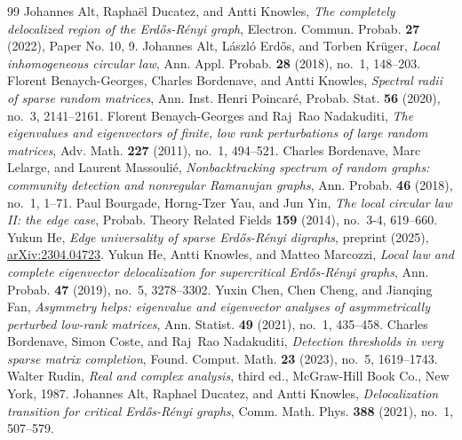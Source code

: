 \documentclass[10pt,a4paper]{amsart}
\numberwithin{equation}{section}
\begin{document}
\begin{thebibliography}{99}
 Johannes Alt, Rapha\"el Ducatez, and Antti Knowles, \emph{The completely delocalized region of the {E}rd{\H o}s-{R}\'enyi graph}, Electron. Commun. Probab. \textbf{27} (2022), Paper No. 10, 9. 
 Johannes Alt, L\'aszl\'o{} Erd{\H o}s, and Torben Kr\"uger, \emph{Local inhomogeneous circular law}, Ann. Appl. Probab. \textbf{28} (2018), no.~1, 148--203. 
 Florent Benaych-Georges, Charles Bordenave, and Antti Knowles, \emph{Spectral radii of sparse random matrices}, Ann. Inst. Henri Poincar{\'e}, Probab. Stat. \textbf{56} (2020), no.~3, 2141--2161.
 Florent Benaych-Georges and Raj~Rao Nadakuditi, \emph{The eigenvalues and eigenvectors of finite, low rank perturbations of large random matrices}, Adv. Math. \textbf{227} (2011), no.~1, 494--521. 
 Charles Bordenave, Marc Lelarge, and Laurent Massouli\'e, \emph{Nonbacktracking spectrum of random graphs: community detection and nonregular {R}amanujan graphs}, Ann. Probab. \textbf{46} (2018), no.~1, 1--71. 
 Paul Bourgade, Horng-Tzer Yau, and Jun Yin, \emph{The local circular law {II}: the edge case}, Probab. Theory Related Fields \textbf{159} (2014), no.~3-4, 619--660. 
 Yukun He, \emph{Edge universality of sparse {Erd{\H{o}}s}-{R{\'e}nyi} digraphs}, preprint (2025), \href{https://arxiv.org/abs/2304.04723}{arXiv:2304.04723}.
 Yukun He, Antti Knowles, and Matteo Marcozzi, \emph{Local law and complete eigenvector delocalization for supercritical {Erd{\H{o}}s}-{R{\'e}nyi} graphs}, Ann. Probab. \textbf{47} (2019), no.~5, 3278--3302.
 Yuxin Chen, Chen Cheng, and Jianqing Fan, \emph{Asymmetry helps: eigenvalue and eigenvector analyses of asymmetrically perturbed low-rank matrices}, Ann. Statist. \textbf{49} (2021), no.~1, 435--458. 
 Charles Bordenave, Simon Coste, and Raj~Rao Nadakuditi, \emph{Detection thresholds in very sparse matrix completion}, Found. Comput. Math. \textbf{23} (2023), no.~5, 1619--1743. 
 Walter Rudin, \emph{Real and complex analysis}, third ed., McGraw-Hill Book Co., New York, 1987. 
 Johannes Alt, Raphael Ducatez, and Antti Knowles, \emph{Delocalization transition for critical {E}rd{\H o}s-{R}\'enyi graphs}, Comm. Math. Phys. \textbf{388} (2021), no.~1, 507--579. 

\end{thebibliography}
\end{document}

